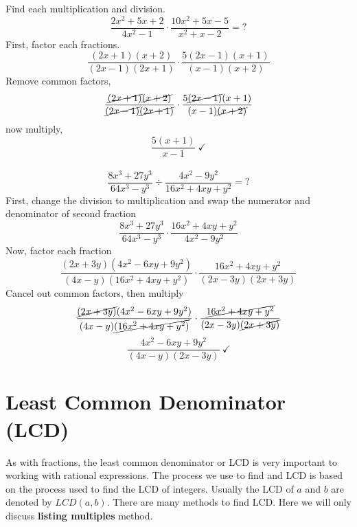 \begin{exa}
	Find each multiplication and division.
    \[
    \frac{2x^2+5x+2}{4x^2-1}\cdot \frac{10x^2+5x-5}{x^2+x-2}=? \]
    First, factor each fractions.\[
        \frac{(2x+1)(x+2)}{(2x-1)(2x+1)}\cdot \frac{5(2x-1)(x+1)}{(x-1)(x+2)}\]
    Remove common factors,
    \[
        \frac{\cancel{(2x+1)}\cancel{(x+2)}}  
        {\cancel{(2x-1)}\cancel{(2x+1)}}       \cdot
        \frac{5\cancel{(2x-1)}(x+1)}{(x-1)\cancel{(x+2)}}
        \]
    now multiply,
    \[	\frac{5(x+1)}{x-1}\ \checkmark
    			\]\\
    \[
    \frac{8x^3+27y^3}{64x^3-y^3}\div \frac{4x^2-9y^2}{16x^2+4xy+y^2}=? \]
    First, change the division to multiplication and swap the numerator and
    denominator of second fraction
     \[
    \frac{8x^3+27y^3}{64x^3-y^3}\cdot \frac{16x^2+4xy+y^2}{4x^2-9y^2} \]
    Now, factor each fraction
     \[
    \frac{(2x+3y)(4x^2-6xy+9y^2)}{(4x-y)(16x^2+4xy+y^2)}\cdot \frac{16x^2+4xy+y^2}{(2x-3y)(2x+3y)} \]
    Cancel out common factors, then multiply
     \[
    \frac{\cancel{(2x+3y)}(4x^2-6xy+9y^2)}{(4x-y)\cancel{(16x^2+4xy+y^2)}}\cdot \frac{\cancel{16x^2+4xy+y^2}}{(2x-3y)\cancel{(2x+3y)}} \] 
      \[
    \frac{4x^2-6xy+9y^2}{(4x-y)(2x-3y)}\ \checkmark \] 
\end{exa}
\section{Least Common Denominator (LCD)}
As with fractions, the least common denominator or LCD is very important to
working with rational expressions. The process we use to find and LCD is based
on the process used to find the LCD of integers. Usually the LCD of $a$ and $b$ are denoted by $LCD(a,b)$. There are many methods to find LCD. Here we will only discuss \textbf{listing multiples} method.

